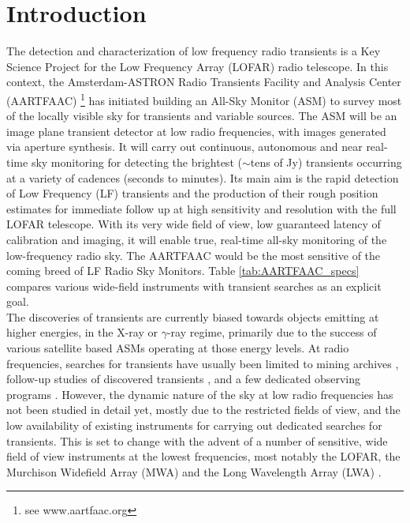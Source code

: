 \documentclass{aa}
\begin{document}
\section{\label{sec:Introduction}Introduction}
The detection  and characterization of low  frequency radio transients  is a Key
Science  Project \citep{fender2006lofar}  for  the Low  Frequency Array  (LOFAR)
\textbf{\citep{vanhaarlem2013lofar}}  radio  telescope.   In this  context,  the
Amsterdam-ASTRON    Radio    Transients    Facility    and    Analysis    Center
(AARTFAAC) \footnote{see  www.aartfaac.org }  has initiated building  an All-Sky
Monitor  (ASM) to  survey most  of the  locally visible  sky for  transients and
variable sources.   The ASM  will be  an image plane  transient detector  at low
radio frequencies, with images generated  via aperture synthesis.  It will carry
out continuous, autonomous  and near real-time sky monitoring  for detecting the
brightest  ($\sim$tens of  Jy) transients  occurring  at a  variety of  cadences
(seconds to minutes). Its main aim  is the rapid detection of Low Frequency (LF)
transients and  the production of  their rough position estimates  for immediate
follow up at high sensitivity and resolution with the full LOFAR telescope. With
its very wide field of view,  low guaranteed latency of calibration and imaging,
it will  enable true,  real-time all-sky monitoring  of the  low-frequency radio
sky. The AARTFAAC  would be the most  sensitive of the coming breed  of LF Radio
Sky  Monitors.   Table   \ref{tab:AARTFAAC_specs}  compares  various  wide-field
instruments with transient searches as an explicit goal.\\

The discoveries of  transients are currently biased towards  objects emitting at
higher  energies, in  the X-ray  or $\gamma$-ray  regime, primarily  due  to the
success of  various satellite  based ASMs operating  at those energy  levels. At
radio frequencies, searches  for transients have usually been  limited to mining
archives \citep{bower2007submillijansky,  bower2011search}, follow-up studies of
discovered  transients \citep{chandra2012radio}, and  a few  dedicated observing
programs  \citep{bannister2012limits,  katz2003survey}.   However,  the  dynamic
nature of the sky  at low radio frequencies has not been  studied in detail yet,
mostly  due to  the  restricted fields  of  view, and  the  low availability  of
existing instruments  for carrying out dedicated searches  for transients.  This
is set to  change with the advent of  a number of sensitive, wide  field of view
instruments at  the lowest  frequencies, most notably  the LOFAR,  the Murchison
Widefield  Array  (MWA) \citep{lonsdale2009murchison}  and  the Long  Wavelength
Array (LWA) \citep{ellingson2009long}.
\end{document}
